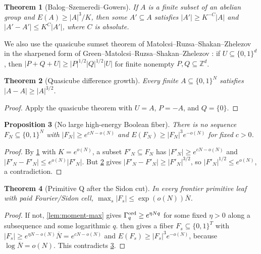 \documentclass[11pt,a4paper]{amsart}
\numberwithin{equation}{section}
\newtheorem{theorem}{Theorem}[section]
\newtheorem{proposition}[theorem]{Proposition}
\theoremstyle{remark}
\newcommand{\Z}{\mathbb Z}
\newcommand{\Gord}{\Gamma^{\rm ord}}
\newcommand{\barN}{\overline N}
\begin{document}
\begin{theorem}[Balog--Szemeredi--Gowers]\label{thm:bsg}
If \(A\) is a finite subset of an abelian group and \(E(A)\ge |A|^3/K\), then some \(A'\subseteq A\) satisfies \(|A'|\ge K^{-C}|A|\) and \(|A'-A'|\le K^C|A'|\), where \(C\) is absolute.
\end{theorem}

We also use the quasicube sumset theorem of Matolcsi--Ruzsa--Shakan--Zhelezov \cite{MRSZ2020} in the sharpened form of Green--Matolcsi--Ruzsa--Shakan--Zhelezov \cite{GMRSZ2020}: if \(U\subseteq\{0,1\}^d\), then \(|P+Q+U|\ge |P|^{1/2}|Q|^{1/2}|U|\) for finite nonempty \(P,Q\subseteq\Z^d\).

\begin{theorem}[Quasicube difference growth]\label{thm:quasicube}
Every finite \(A\subseteq\{0,1\}^{N}\) satisfies \(|A-A|\ge |A|^{3/2}\).
\end{theorem}

\begin{proof}
Apply the quasicube theorem with \(U=A\), \(P=-A\), and \(Q=\{0\}\).
\end{proof}

\begin{proposition}[No large high-energy Boolean fiber]\label{prop:no-high-energy}
There is no sequence \(F_N\subseteq\{0,1\}^{N}\) with \(|F_N|\ge e^{cN-o(N)}\) and \(E(F_N)\ge |F_N|^3e^{-o(N)}\) for fixed \(c>0\).
\end{proposition}

\begin{proof}
By \cref{thm:bsg} with \(K=e^{o(N)}\), a subset \(F'_N\subseteq F_N\) has \(|F'_N|\ge e^{cN-o(N)}\) and \(|F'_N-F'_N|\le e^{o(N)}|F'_N|\).  But \cref{thm:quasicube} gives \(|F'_N-F'_N|\ge |F'_N|^{3/2}\), so \(|F'_N|^{1/2}\le e^{o(N)}\), a contradiction.
\end{proof}

\begin{theorem}[Primitive Q after the Sidon cut]\label{thm:primitive-q}
In every frontier primitive leaf with paid Fourier/Sidon cell, \(\max_s|F_s|\le\exp(o(N))\barN\).
\end{theorem}

\begin{proof}
If not, \cref{lem:moment-max} gives \(\Gord_q\ge e^{\eta Nq}\) for some fixed \(\eta>0\) along a subsequence and some logarithmic \(q\).   then gives a fiber \(F_s\subseteq\{0,1\}^{T}\) with \(|F_s|\ge e^{\eta N-o(N)}\barN=e^{cN-o(N)}\) and \(E(F_s)\ge |F_s|^3e^{-o(N)}\), because \(\log\barN=o(N)\).  This contradicts \cref{prop:no-high-energy}.
\end{proof}
\end{document}
